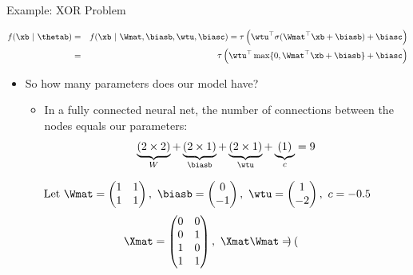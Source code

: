 \begin{vbframe}{Example: XOR Problem}
\begin{itemize}
  \end{itemize}
  \begin{eqnarray*}
    f(\xb~|~\thetab) &=& f(\xb~|~ \Wmat, \biasb, \wtu, \biasc) = \tau\left(\wtu^\top\sigma(\Wmat^\top \xb+\biasb)+\biasc\right) \\
                &=& \tau\left(\wtu^\top \max\{0, \Wmat^\top \xb+\biasb\} + \biasc\right)
  \end{eqnarray*}
  \begin{itemize}
    \item So how many parameters does our model have?
    \begin{itemize}
      \item In a fully connected neural net, the number of connections between the nodes equals our parameters: $$\underbrace{(2 \times 2)}_{W} + \underbrace{(2 \times 1)}_{\biasb} + \underbrace{(2 \times 1)}_{\wtu} + \underbrace{(1)}_{c} = 9$$
    \end{itemize}
  \end{itemize}
\framebreak
  \begin{eqnarray*}
   \text{Let} \ \Wmat = \begin{pmatrix}
      1 & 1 \\
      1 & 1
    \end{pmatrix}, \
      \biasb = \begin{pmatrix}
      0 \\
      -1
    \end{pmatrix}, \
      \wtu = \begin{pmatrix}
      1 \\
      -2
    \end{pmatrix}, \
      c = - 0.5
  \end{eqnarray*}
  \begin{eqnarray*}
    \Xmat = \begin{pmatrix}
      0 & 0 \\
      0 & 1 \\
      1 & 0 \\
      1 & 1
    \end{pmatrix}, \
    \Xmat \Wmat = \begin{pmatrix}

\end{pmatrix}
\end{eqnarray*}
\end{vbframe}
